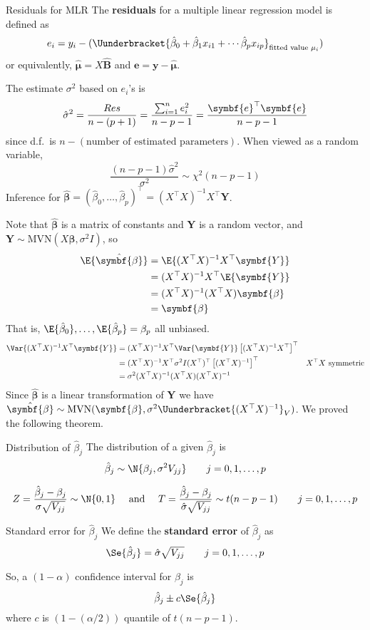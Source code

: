 \begin{Definition}{Residuals for MLR}{}
    The \textbf{residuals} for a multiple linear regression model is defined
    as
    \[ e_i=y_i-(\Uunderbracket{\hat{\beta}_0+\hat{\beta}_1x_{i1}+\cdots\hat{\beta}_p x_{ip}
        }_{\text{fitted value }\mu_i}) \]
    or equivalently, $ \hat{\symbf{\mu}}=X\hat{\symbf{B}} $ and
    $ \symbf{e}=\symbf{y}-\hat{\symbf{\mu}} $.
\end{Definition}
The estimate $ \sigma^2 $ based on $ e_i $'s is
\[ \hat{\sigma}^2=\frac{\SS{Res}}{n-(p+1)}=
    \frac{\sum_{i=1}^{n} e_i^2}{n-p-1}=\frac{\symbf{e}^\top\symbf{e}}{n-p-1}  \]
since d.f.\ is $ n-(\text{number of estimated parameters}) $. When viewed
as a random variable,
\[ \frac{(n-p-1)\hat{\sigma}^2}{\sigma^2}\sim \chi^2(n-p-1)  \]
Inference for $ \hat{\symbf{\beta}}=(\hat{\beta}_0,\ldots,\hat{\beta}_p)^\top
    =(X^\top X)^{-1}X^\top \symbf{Y} $.

Note that $ \hat{\symbf{\beta}} $ is a matrix of constants and
$ \symbf{Y} $ is a random vector, and
$ \symbf{Y}\sim \text{MVN}(X\symbf{\beta},\sigma^2 I) $, so
\begin{align*}
    \E{\hat{\symbf{\beta}}}
     & =\E{(X^\top X)^{-1}X^\top \symbf{Y}}    \\
     & =(X^\top X)^{-1}X^\top\E{\symbf{Y}}     \\
     & =(X^\top X)^{-1}(X^\top X)\symbf{\beta} \\
     & =\symbf{\beta}
\end{align*}
That is, $ \E{\hat{\beta}_0},\ldots,\E{\hat{\beta}_p}=\beta_p $
all unbiased.
\begin{align*}
    \Var{(X^\top X)^{-1}X^\top\symbf{Y}}
     & =(X^\top X)^{-1}X^{\top}\Var{\symbf{Y}}\left[ (X^\top X)^{-1}X^\top \right]^\top                              \\
     & =(X^\top X)^{-1}X^\top \sigma^2 I(X^\top)^\top\left[ (X^\top X)^{-1} \right]^\top & X^\top X\text{ symmetric} \\
     & =\sigma^2(X^\top X)^{-1}(X^\top X)(X^\top X)^{-1}
\end{align*}
Since $ \hat{\symbf{\beta}} $ is a linear transformation of $ \symbf{Y} $
we have
$ \hat{\symbf{\beta}} \sim \text{MVN}(\symbf{\beta},\sigma^2
    \Uunderbracket{(X^\top X)^{-1}}_{V}) $. We proved the following theorem.
\begin{Theorem}{Distribution of $ \hat{\beta}_j $}{}
    The distribution of a given $ \hat{\beta}_j $ is
    \[ \hat{\beta}_j \sim \N{\beta_j,\sigma^2 V_{jj}}\qquad j=0,1,\ldots,p \]
\end{Theorem}
\[ Z=\frac{\hat{\beta}_j-\beta_j}{\sigma\sqrt{V_{jj}}} \sim \N{0,1}\quad
    \text{ and }\quad
    T=\frac{\hat{\beta}_j-\beta_j}{\hat{\sigma}\sqrt{V_{jj}}} \sim t(n-p-1)\qquad
    j=0,1,\ldots,p   \]
\begin{Definition}{Standard error for $ \hat{\beta}_j $}{}
    We define the \textbf{standard error} of $ \hat{\beta}_j $ as
    \[ \Se{\hat{\beta}_j}=\hat{\sigma}\sqrt{V_{jj}}\qquad j=0,1,\ldots,p  \]
\end{Definition}
So, a $ (1-\alpha) $ confidence interval for $ \beta_j $
is
\[ \hat{\beta}_j\pm c\Se{\hat{\beta}_j} \]
where $ c $ is $ (1-(\alpha/2)) $ quantile of $ t(n-p-1) $.

